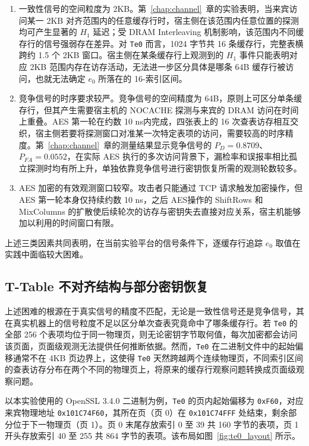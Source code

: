 \begin{enumerate}
  \item 一致性信号的空间粒度为 2KB。第~\ref{chap:channel}~章的实验表明，当来宾访问某一 2KB 对齐范围内的任意缓存行时，宿主侧在该范围内任意位置的探测均可产生显著的 $H_1$ 延迟；受 DRAM Interleaving 机制影响，该范围内不同缓存行的信号强弱存在差异。对 \texttt{Te0} 而言，1024 字节共 16 条缓存行，完整表横跨约 1.5 个 2KB 窗口。宿主侧在某条缓存行上观测到的 $H_1$ 事件只能表明对应 2KB 范围内存在访存活动，无法进一步区分具体是哪条 64B 缓存行被访问，也就无法确定 $e_0$ 所落在的 16-索引区间。

  \item 竞争信号的时序要求较严。竞争信号的空间精度为 64B，原则上可区分单条缓存行，但其产生需要宿主机的 NOCACHE 探测与来宾的 DRAM 访问在时间上重叠。AES 第一轮在约数 10 ns内完成，四张表上的 16 次查表访存相互交织，宿主侧若要将探测窗口对准某一次特定表项的访问，需要较高的时序精度。第~\ref{chap:channel}~章的测量结果显示竞争信号的 $P_D = 0.8709$、$P_{FA} = 0.0552$，在实际 AES 执行的多次访问背景下，漏检率和误报率相比孤立探测时均有所上升，单独依靠竞争信号进行密钥恢复所需的观测轮数较多。

  \item  AES 加密的有效观测窗口较窄。攻击者只能通过 TCP 请求触发加密操作，但 AES 第一轮本身仅持续约数 10 ns，之后 AES操作的 ShiftRows 和 MixColumns 的扩散使后续轮次的访存与密钥失去直接对应关系，宿主机能够加以利用的时间窗口有限。
\end{enumerate}

上述三类因素共同表明，在当前实验平台的信号条件下，逐缓存行追踪 $e_0$ 取值在实践中面临较大困难。

\subsection{T-Table 不对齐结构与部分密钥恢复}
\label{subsec:te0_misalign}

上述困难的根源在于真实信号的精度不匹配，无论是一致性信号还是竞争信号，其在真实机器上的信号粒度不足以区分单次查表究竟命中了哪条缓存行。若 \texttt{Te0} 的全部 256 个表项均位于同一物理页，则无论密钥字节取何值，每次加密都会访问该页面，页面级观测无法提供任何推断依据。然而，\texttt{Te0} 在二进制文件中的起始偏移通常不在 4KB 页边界上，这使得 \texttt{Te0} 天然跨越两个连续物理页，不同索引区间的查表访存分布在两个不同的物理页上，将原来的缓存行观察问题转换成页面级观察问题。

以本实验使用的 OpenSSL 3.4.0 二进制为例，\texttt{Te0} 的页内起始偏移为 \texttt{0xF60}，对应来宾物理地址 \texttt{0x101C74F60}，其所在页（页 0）在 \texttt{0x101C74FFF} 处结束，剩余部分位于下一物理页（页 1）。页 0 末尾存放索引 0 至 39 共 160 字节的表项，页 1 开头存放索引 40 至 255 共 864 字节的表项。该布局如图~\ref{fig:te0_layout} 所示。


